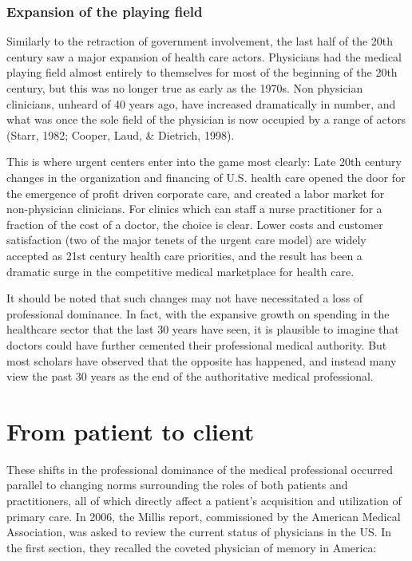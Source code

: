 \documentclass[12pt,twoside]{reedthesis}
\begin{document}
  \subsubsection*{Expansion of the playing
  field}\label{expansion-of-the-playing-field}
  
  Similarly to the retraction of government involvement, the last half of
  the 20th century saw a major expansion of health care actors. Physicians
  had the medical playing field almost entirely to themselves for most of
  the beginning of the 20th century, but this was no longer true as early
  as the 1970s. Non physician clinicians, unheard of 40 years ago, have
  increased dramatically in number, and what was once the sole field of
  the physician is now occupied by a range of actors (Starr, 1982; Cooper,
  Laud, \& Dietrich, 1998).
  
  This is where urgent centers enter into the game most clearly: Late 20th
  century changes in the organization and financing of U.S. health care
  opened the door for the emergence of profit driven corporate care, and
  created a labor market for non-physician clinicians. For clinics which
  can staff a nurse practitioner for a fraction of the cost of a doctor,
  the choice is clear. Lower costs and customer satisfaction (two of the
  major tenets of the urgent care model) are widely accepted as 21st
  century health care priorities, and the result has been a dramatic surge
  in the competitive medical marketplace for health care.
  
  It should be noted that such changes may not have necessitated a loss of
  professional dominance. In fact, with the expansive growth on spending
  in the healthcare sector that the last 30 years have seen, it is
  plausible to imagine that doctors could have further cemented their
  professional medical authority. But most scholars have observed that the
  opposite has happened, and instead many view the past 30 years as the
  end of the authoritative medical professional.
  
  \section*{From patient to client}\label{from-patient-to-client}
  
  These shifts in the professional dominance of the medical professional
  occurred parallel to changing norms surrounding the roles of both
  patients and practitioners, all of which directly affect a patient's
  acquisition and utilization of primary care. In 2006, the Millis report,
  commissioned by the American Medical Association, was asked to review
  the current status of physicians in the US. In the first section, they
  recalled the coveted physician of memory in America:
  
\end{document}
